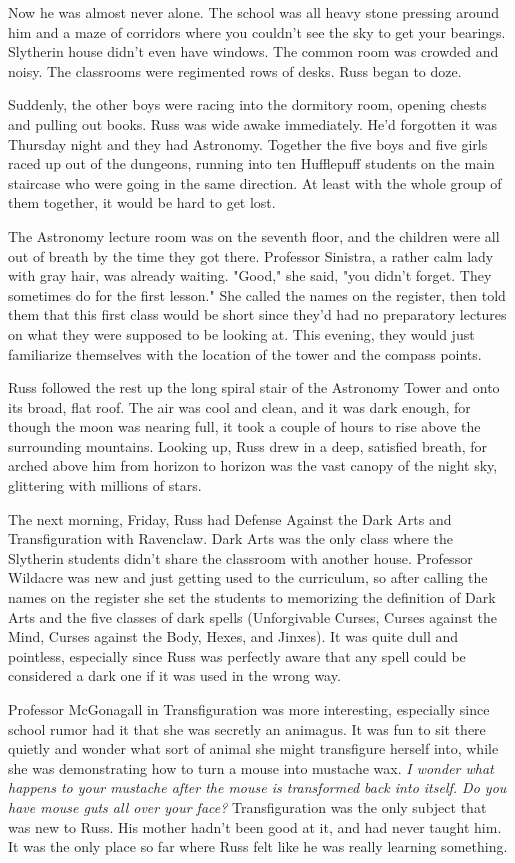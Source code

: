Now he was almost never alone. The school was all heavy stone pressing around him and a maze of corridors where you couldn't see the sky to get your bearings. Slytherin house didn't even have windows. The common room was crowded and noisy. The classrooms were regimented rows of desks. Russ began to doze.

Suddenly, the other boys were racing into the dormitory room, opening chests and pulling out books. Russ was wide awake immediately. He'd forgotten it was Thursday night and they had Astronomy. Together the five boys and five girls raced up out of the dungeons, running into ten Hufflepuff students on the main staircase who were going in the same direction. At least with the whole group of them together, it would be hard to get lost.

The Astronomy lecture room was on the seventh floor, and the children were all out of breath by the time they got there. Professor Sinistra, a rather calm lady with gray hair, was already waiting. "Good," she said, "you didn't forget. They sometimes do for the first lesson." She called the names on the register, then told them that this first class would be short since they'd had no preparatory lectures on what they were supposed to be looking at. This evening, they would just familiarize themselves with the location of the tower and the compass points.

Russ followed the rest up the long spiral stair of the Astronomy Tower and onto its broad, flat roof. The air was cool and clean, and it was dark enough, for though the moon was nearing full, it took a couple of hours to rise above the surrounding mountains. Looking up, Russ drew in a deep, satisfied breath, for arched above him from horizon to horizon was the vast canopy of the night sky, glittering with millions of stars.

The next morning, Friday, Russ had Defense Against the Dark Arts and Transfiguration with Ravenclaw. Dark Arts was the only class where the Slytherin students didn't share the classroom with another house. Professor Wildacre was new and just getting used to the curriculum, so after calling the names on the register she set the students to memorizing the definition of Dark Arts and the five classes of dark spells (Unforgivable Curses, Curses against the Mind, Curses against the Body, Hexes, and Jinxes). It was quite dull and pointless, especially since Russ was perfectly aware that any spell could be considered a dark one if it was used in the wrong way.

Professor McGonagall in Transfiguration was more interesting, especially since school rumor had it that she was secretly an animagus. It was fun to sit there quietly and wonder what sort of animal she might transfigure herself into, while she was demonstrating how to turn a mouse into mustache wax. \emph{I wonder what happens to your mustache after the mouse is transformed back into itself. Do you have mouse guts all over your face?} Transfiguration was the only subject that was new to Russ. His mother hadn't been good at it, and had never taught him. It was the only place so far where Russ felt like he was really learning something.

